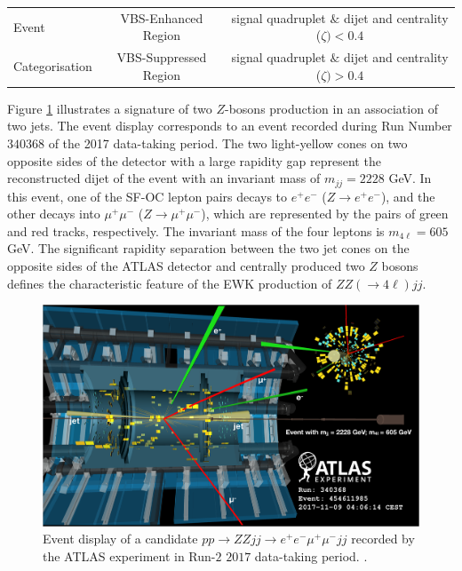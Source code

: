 \begin{table}[!htb]
\begin{tabular}{|| l || c | c ||}
        Event               & VBS-Enhanced Region       & signal quadruplet $\&$ dijet and centrality ($\zeta) < 0.4 $              \\
        Categorisation          & VBS-Suppressed Region     & signal quadruplet $\&$ dijet and centrality ($\zeta) > 0.4$               \\
        
        \hline
    \end{tabular}
\end{table}

Figure \ref{fig:EventDisplayZZjj} illustrates a signature of two $Z$-bosons production in an association of two jets. The event display corresponds to an event recorded during Run Number $340368$ of the 2017 data-taking period. The two light-yellow cones on two opposite sides of the detector with a large rapidity gap represent the reconstructed dijet of the event with an invariant mass of $m_{jj} = 2228$ GeV. In this event, one of the SF-OC lepton pairs decays to  $e^+e^-$ ($Z\rightarrow e^+e^-$), and the other decays into $\mu^+\mu^-$ ($Z\rightarrow \mu^+\mu^-$), which are represented by the pairs of green and red tracks, respectively. The invariant mass of the four leptons is $m_{4\ell} = 605$ GeV. The significant rapidity separation between the two jet cones on the opposite sides of the ATLAS detector and centrally produced two $Z$ bosons defines the characteristic feature of the EWK production of $ZZ (\rightarrow 4\ell) jj$. 

\begin{figure}
\centering
\includegraphics[width=.9\linewidth]{figures/AnalysisOverview/ZZjjEventDisplay.png}  
\caption{Event display of a candidate $pp \rightarrow ZZjj \rightarrow e^+e^-\mu^+\mu^- jj $ recorded by the ATLAS experiment in Run-$2$ $2017$ data-taking period. \label{fig:EventDisplayZZjj} \cite{ATLASZZjj}.}
\end{figure}